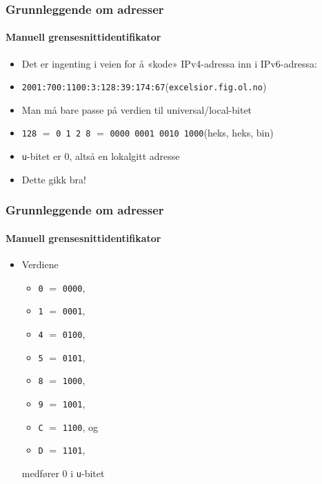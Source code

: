 \begin{frame}
  \frametitle{Grunnleggende om adresser}
  \framesubtitle{Manuell grensesnittidentifikator}
  \begin{itemize}
  \item Det er ingenting i veien for å «kode» IPv4-adressa inn i
    IPv6-adressa:
  \item \texttt{2001:700:1100:3:\alert{128:39:174:67}}\hfill(\texttt{excelsior.fig.ol.no})
  \item Man må bare passe på verdien til universal/local-bitet
  \item \texttt{128} \(=\) \texttt{0 1 2 8} \(=\) \texttt{0000 00\alert{0}1 0010 1000}\hfill(heks, heks, bin)
  \item \texttt{u}-bitet er \(0\), altså en lokalgitt adresse
  \item Dette gikk bra!
  \end{itemize}
\end{frame}

\begin{frame}
  \frametitle{Grunnleggende om adresser}
  \framesubtitle{Manuell grensesnittidentifikator}
  \begin{itemize}
  \item Verdiene
    \begin{itemize}
    \item \texttt{0} \(=\) \texttt{00\alert{0}0},
    \item \texttt{1} \(=\) \texttt{00\alert{0}1},
    \item \texttt{4} \(=\) \texttt{01\alert{0}0},
    \item \texttt{5} \(=\) \texttt{01\alert{0}1},
    \item \texttt{8} \(=\) \texttt{10\alert{0}0},
    \item \texttt{9} \(=\) \texttt{10\alert{0}1},
    \item \texttt{C} \(=\) \texttt{11\alert{0}0}, og
    \item \texttt{D} \(=\) \texttt{11\alert{0}1},
    \end{itemize}
    medfører \(0\) i \texttt{u}-bitet
  \end{itemize}
\end{frame}


